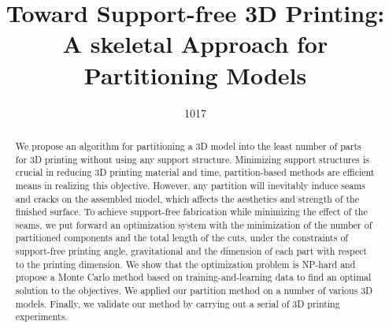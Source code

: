 \documentclass{egpubl}
\title[Toward Support-free 3D Printing:]%
      {Toward Support-free 3D Printing: A skeletal Approach for Partitioning Models}
\author[1017]{1017}
\begin{document}

\maketitle

\begin{abstract}
   We propose an algorithm for partitioning a 3D model into the least number of parts for 3D printing without using any support structure. Minimizing support structures is crucial in reducing 3D printing material and time, partition-based methods are efficient means in realizing this objective. However, any partition will inevitably induce seams and cracks on the assembled model, which affects the aesthetics and strength of the finished surface. To achieve support-free fabrication while minimizing the effect of the seams, we put forward an optimization system with the minimization of the number of partitioned components and the total length of the cuts, under the constraints of support-free printing angle, gravitational and the dimension of each part with respect to the printing dimension. We show that the optimization problem is NP-hard and propose a Monte Carlo method based on training-and-learning data to find an optimal solution to the objectives. We applied our partition method on a number of various 3D models. Finally, we validate our method by carrying out a serial of 3D printing experiments.


\begin{classification} %
\end{classification}

\end{abstract}














\end{document}
